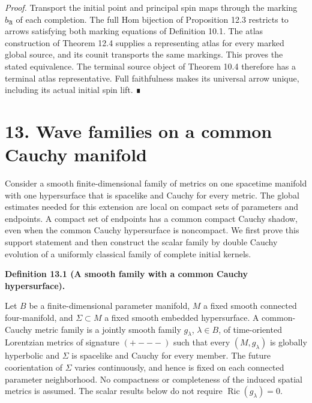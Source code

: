 \documentclass[
  english,
  11pt,
  reqno]{amsart}
\makeatletter
\newcommand{\pandocstatementheading}[1]{%
  \par\if@nobreak\else
    \addpenalty{\@beginparpenalty}%
    \addvspace{.5\baselineskip plus .2\baselineskip minus .2\baselineskip}%
  \fi
  {\normalfont\bfseries #1\par}%
  \nobreak\@afterindenttrue\@afterheading
}
\newcommand{\paperblockheading}[2][.45\baselineskip]{%
  \par\Needspace{6\baselineskip}%
  \addvspace{\baselineskip}%
  \noindent{\normalfont\bfseries #2}\par\nobreak
  \vskip#1\relax\nobreak
}
\makeatother
\begin{document}
\emph{Proof.} Transport the initial point and principal spin maps
through the marking \(b_{\mathfrak A}\) of each completion. The full Hom
bijection of Proposition 12.3 restricts to arrows satisfying both
marking equations of Definition 10.1. The atlas construction of Theorem
12.4 supplies a representing atlas for every marked global source, and
its counit transports the same markings. This proves the stated
equivalence. The terminal source object of Theorem 10.4 therefore has a
terminal atlas representative. Full faithfulness makes its universal
arrow unique, including its actual initial spin lift. ∎

\protect{}\label{sec:common-cauchy-wave-families}

\section{13. Wave families on a common Cauchy
manifold}\label{wave-families-on-a-common-cauchy-manifold}

Consider a smooth finite-dimensional family of metrics on one spacetime
manifold with one hypersurface that is spacelike and Cauchy for every
metric. The global estimates needed for this extension are local on
compact sets of parameters and endpoints. A compact set of endpoints has
a common compact Cauchy shadow, even when the common Cauchy hypersurface
is noncompact. We first prove this support statement and then construct
the scalar family by double Cauchy evolution of a uniformly classical
family of complete initial kernels.

\paperblockheading[0pt]{Common causal control.}

\pandocstatementheading{\protect{}\label{def:common-cauchy-metric-family}Definition 13.1 (A smooth family with a common Cauchy hypersurface).}

Let \(B\) be a finite-dimensional parameter manifold, \(M\) a fixed
smooth connected four-manifold, and \(\Sigma\subset M\) a fixed smooth
embedded hypersurface. A common-Cauchy metric family is a jointly smooth
family \(g_\lambda\), \(\lambda\in B\), of time-oriented Lorentzian
metrics of signature \((+---)\) such that every \((M,g_\lambda)\) is
globally hyperbolic and \(\Sigma\) is spacelike and Cauchy for every
member. The future coorientation of \(\Sigma\) varies continuously, and
hence is fixed on each connected parameter neighborhood. No compactness
or completeness of the induced spatial metrics is assumed. The scalar
results below do not require \(\operatorname{Ric}(g_\lambda)=0\).
\end{document}
